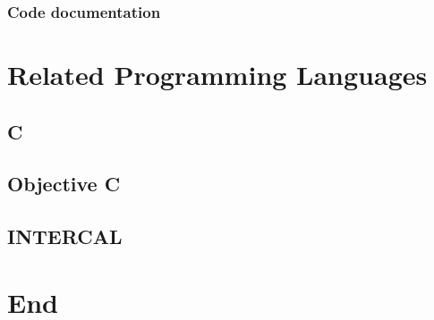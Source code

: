 \documentclass[11pt,twoside]{book}
\begin{document}
\section{Code documentation}



\part{Related Programming Languages}

\chapter{C}

\chapter{Objective C}

\chapter{INTERCAL}


\part{End}



\end{document}
